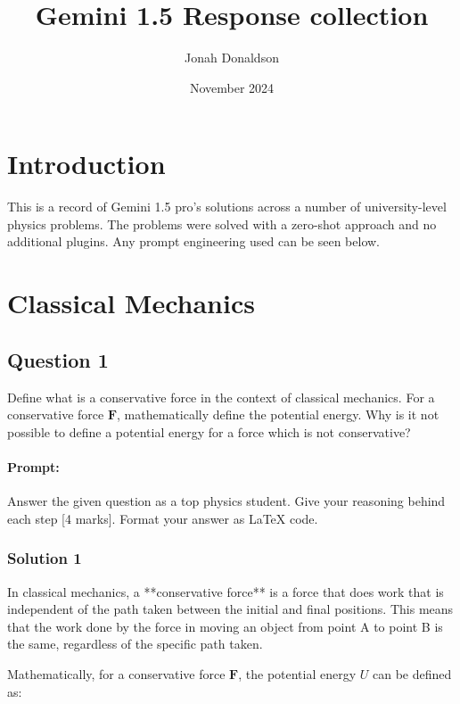\documentclass{article}
\title{Gemini 1.5 Response collection}
\author{Jonah Donaldson}
\date{November 2024}
\begin{document}
\maketitle

\tableofcontents
\newpage

\section{Introduction}

This is a record of Gemini 1.5 pro's solutions across a number of university-level physics problems. The problems were solved with a zero-shot approach and no additional plugins. Any prompt engineering used can be seen below.

\section{Classical Mechanics}

\subsection{Question 1}
Define what is a conservative force in the context of classical mechanics. For a conservative force $\mathbf{F}$, mathematically define the potential energy. Why is it not possible to define a potential energy for a force which is not conservative? 

\paragraph{Prompt: \\} 
Answer the given question as a top physics student. Give your reasoning behind each step [4 marks].
Format your answer as LaTeX code.

\subsubsection{Solution 1}

In classical mechanics, a **conservative force** is a force that does work that is independent of the path taken between the initial and final positions. This means that the work done by the force in moving an object from point A to point B is the same, regardless of the specific path taken.

Mathematically, for a conservative force $\mathbf{F}$, the potential energy $U$ can be defined as:
\end{document}
